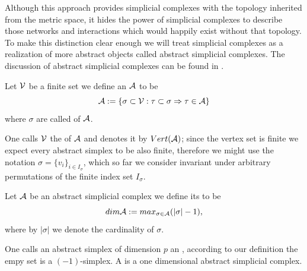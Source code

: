 \documentclass[../1.tex]{subfiles}
\begin{document}


    Although this approach provides simplicial complexes with the topology inherited from the metric space, it hides the power of simplicial complexes 
    to describe those networks and interactions which would happily exist without that topology. To make this distinction clear enough we will treat
    simplicial complexes as a realization of more abstract objects called abstract simplicial complexes. The discussion of abstract simplicial complexes
    can be found in \cite{rotman}.
    
    \begin{defn}
        Let $\mathcal{V}$ be a finite set we define an  $\mathcal{A}$ to be 
        \[\mathcal{A}:=\{ \sigma  \subset \mathcal{V} : \tau \subset \sigma \Rightarrow \tau \in \mathcal{A} \}\] 
        where $\sigma$ are called  of $\mathcal{A}$.
    \end{defn}
    
    One calls $\mathcal{V}$ the  of $\mathcal{A}$ and denotes it by $Vert(\mathcal{A})$; since the vertex
    set is finite we expect every abstract simplex to be also finite, therefore we might use the notation $\sigma = \{ v_i \}_{i \in I_\sigma}$,
    which so far we consider invariant under arbitrary permutations of the finite index set $I_\sigma$.

    \begin{defn}
        Let $\mathcal{A}$ be an abstract simplicial complex we define its  to be
        \[ dim \mathcal{A} := max_{\sigma \in \mathcal{A}}(|\sigma|-1), \]
        where by $|\sigma|$ we denote the cardinality of $\sigma$.
    \end{defn}

    One calls an abstract simplex of dimension $p$ an , according to our
    definition the empy set is a $(-1)$-simplex. A  is a one dimensional abstract simplicial complex.

\end{document}
